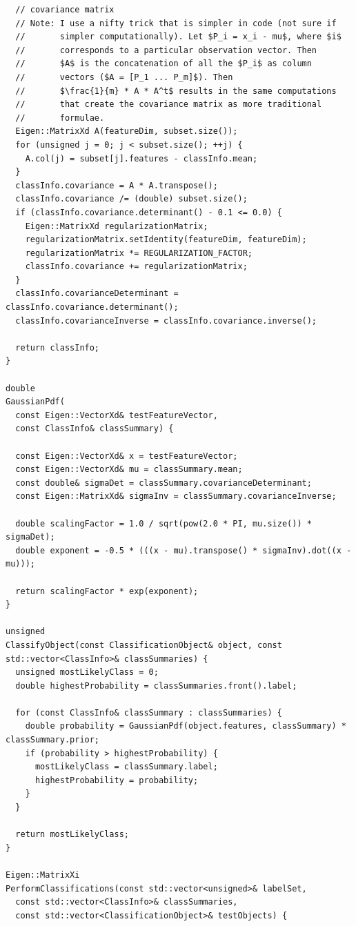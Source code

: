 \documentclass{article}
\begin{document}
\begin{verbatim}
  // covariance matrix
  // Note: I use a nifty trick that is simpler in code (not sure if
  //       simpler computationally). Let $P_i = x_i - mu$, where $i$
  //       corresponds to a particular observation vector. Then
  //       $A$ is the concatenation of all the $P_i$ as column
  //       vectors ($A = [P_1 ... P_m]$). Then
  //       $\frac{1}{m} * A * A^t$ results in the same computations
  //       that create the covariance matrix as more traditional
  //       formulae.
  Eigen::MatrixXd A(featureDim, subset.size());
  for (unsigned j = 0; j < subset.size(); ++j) {
    A.col(j) = subset[j].features - classInfo.mean;
  }
  classInfo.covariance = A * A.transpose();
  classInfo.covariance /= (double) subset.size();
  if (classInfo.covariance.determinant() - 0.1 <= 0.0) {
    Eigen::MatrixXd regularizationMatrix;
    regularizationMatrix.setIdentity(featureDim, featureDim);
    regularizationMatrix *= REGULARIZATION_FACTOR;
    classInfo.covariance += regularizationMatrix;
  }
  classInfo.covarianceDeterminant = classInfo.covariance.determinant();
  classInfo.covarianceInverse = classInfo.covariance.inverse();

  return classInfo;
}

double
GaussianPdf(
  const Eigen::VectorXd& testFeatureVector,
  const ClassInfo& classSummary) {

  const Eigen::VectorXd& x = testFeatureVector;
  const Eigen::VectorXd& mu = classSummary.mean;
  const double& sigmaDet = classSummary.covarianceDeterminant;
  const Eigen::MatrixXd& sigmaInv = classSummary.covarianceInverse; 

  double scalingFactor = 1.0 / sqrt(pow(2.0 * PI, mu.size()) * sigmaDet);
  double exponent = -0.5 * (((x - mu).transpose() * sigmaInv).dot((x - mu)));

  return scalingFactor * exp(exponent);
}

unsigned
ClassifyObject(const ClassificationObject& object, const std::vector<ClassInfo>& classSummaries) {
  unsigned mostLikelyClass = 0;
  double highestProbability = classSummaries.front().label;

  for (const ClassInfo& classSummary : classSummaries) {
    double probability = GaussianPdf(object.features, classSummary) * classSummary.prior;
    if (probability > highestProbability) {
      mostLikelyClass = classSummary.label;
      highestProbability = probability;
    }
  }

  return mostLikelyClass;
}

Eigen::MatrixXi
PerformClassifications(const std::vector<unsigned>& labelSet,
  const std::vector<ClassInfo>& classSummaries,
  const std::vector<ClassificationObject>& testObjects) {


\end{verbatim}
\end{document}

